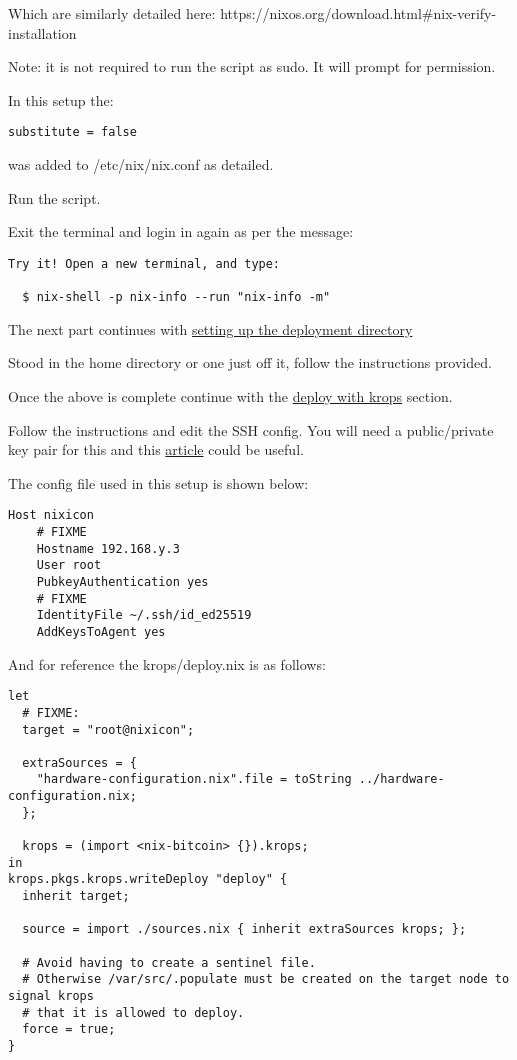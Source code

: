 Which are similarly detailed here:
https://nixos.org/download.html\#nix-verify-installation

Note: it is not required to run the script as sudo. It will prompt for
permission.

In this setup the:

\begin{verbatim}
substitute = false
\end{verbatim}

was added to /etc/nix/nix.conf as detailed.

Run the script.

Exit the terminal and login in again as per the message:

\begin{verbatim}
Try it! Open a new terminal, and type:

  $ nix-shell -p nix-info --run "nix-info -m"
\end{verbatim}

The next part continues with
\href{https://github.com/fort-nix/nix-bitcoin/blob/master/docs/install.md\#3-setup-deployment-directory}{setting
up the deployment directory}

Stood in the home directory or one just off it, follow the instructions
provided.

Once the above is complete continue with the
\href{https://github.com/fort-nix/nix-bitcoin/blob/master/docs/install.md\#4-deploy-with-krops}{deploy
with krops} section.

Follow the instructions and edit the SSH config. You will need a
public/private key pair for this and this
\href{https://www.digitalocean.com/community/tutorials/how-to-set-up-ssh-keys-2}{article}
could be useful.

The config file used in this setup is shown below:

\begin{verbatim}
Host nixicon
    # FIXME
    Hostname 192.168.y.3
    User root
    PubkeyAuthentication yes
    # FIXME
    IdentityFile ~/.ssh/id_ed25519
    AddKeysToAgent yes
\end{verbatim}

And for reference the krops/deploy.nix is as follows:

\begin{verbatim}
let
  # FIXME:
  target = "root@nixicon";

  extraSources = {
    "hardware-configuration.nix".file = toString ../hardware-configuration.nix;
  };

  krops = (import <nix-bitcoin> {}).krops;
in
krops.pkgs.krops.writeDeploy "deploy" {
  inherit target;

  source = import ./sources.nix { inherit extraSources krops; };

  # Avoid having to create a sentinel file.
  # Otherwise /var/src/.populate must be created on the target node to signal krops
  # that it is allowed to deploy.
  force = true;
}
\end{verbatim}


